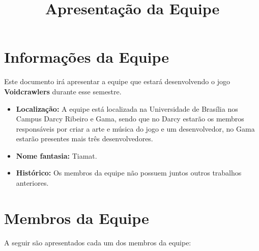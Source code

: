 \documentclass[a4paper, 11pt]{article} %
\title{\textbf{Apresentação da Equipe}} %
\makeatletter
\renewcommand{\maketitle}{ %
\begin{center} %
{\LARGE\@title} %

\vspace{20pt} %

\end{center}
}
\makeatother
\begin{document}
\maketitle %


\section*{Informações da Equipe}

Este documento irá apresentar a equipe que estará desenvolvendo o jogo \textbf{Voidcrawlers} durante esse semestre.

\begin{itemize}
\item \textbf{Localização:} A equipe está localizada na Universidade de Brasília nos Campus Darcy Ribeiro e Gama, sendo que no Darcy estarão os membros responsáveis por criar a arte e música do jogo e um desenvolvedor, no Gama estarão presentes mais três desenvolvedores.

\item \textbf{Nome fantasia:} Tiamat.
\item \textbf{Histórico:} Os membros da equipe não possuem juntos outros trabalhos anteriores.
\end{itemize}

\section*{Membros da Equipe}

A seguir são apresentados cada um dos membros da equipe:
\end{document}
